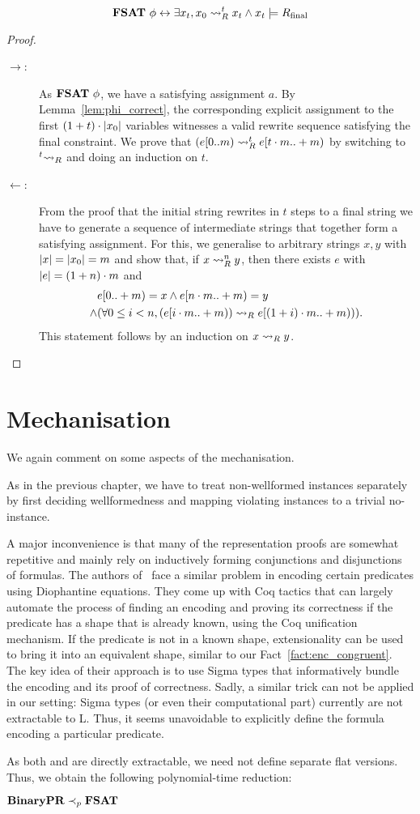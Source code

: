 \begin{theorem}
  \[\textbf{FSAT}~\phi \leftrightarrow \exists x_t, x_0 \rightsquigarrow_{R}^t x_t \land x_t \models R_{\text{final}} \]
\end{theorem}
\begin{proof}\leavevmode
  \begin{description}
    \item[$\rightarrow$:]
      As $\textbf{FSAT}{}~\phi$, we have a satisfying assignment $a$. 
      By Lemma~\ref{lem:phi_correct}, the corresponding explicit assignment to the first $(1 +{t}) \cdot |x_0|$ variables witnesses a valid rewrite sequence satisfying the final constraint. 
      We prove that $(e[0 ..m) \rightsquigarrow_{R}^t e[t \cdot m ..+ m)$ by switching to $\prescript{t}{}{\rightsquigarrow_{R}}$ and doing an induction on $t$.
    \item[$\leftarrow$:]
      From the proof that the initial string rewrites in $t$ steps to a final string we have to generate a sequence of intermediate strings that together form a satisfying assignment. 
      For this, we generalise to arbitrary strings $x, y$ with $|x| = |x_0| = m$ and show that, if $x \rightsquigarrow_{R}^n y$, then there exists $e$ with $|e| = (1 +{n}) \cdot m$ and 
      \begin{align*}
        &e[0..+ m) = x \land e[n \cdot m ..+ m) = y \\
        \land & (\forall 0 \le i < n, (e[i \cdot m ..+ m)) \rightsquigarrow_{R} e[(1 +{i}) \cdot m ..+ m))).
      \end{align*}
      This statement follows by an induction on $x \rightsquigarrow_{R} y$.
  \end{description}
\end{proof}

\section{Mechanisation}
We again comment on some aspects of the mechanisation.

As in the previous chapter, we have to treat non-wellformed instances separately by first deciding wellformedness and mapping violating instances to a trivial no-instance. 

A major inconvenience is that many of the representation proofs are somewhat repetitive and mainly rely on inductively forming conjunctions and disjunctions of formulas. 
The authors of~\cite{Larchey-WendlingForster:2019:H10_in_Coq} face a similar problem in encoding certain predicates using Diophantine equations. They come up with Coq tactics that can largely automate the process of finding an encoding and proving its correctness if the predicate has a shape that is already known, using the Coq unification mechanism. If the predicate is not in a known shape, extensionality can be used to bring it into an equivalent shape, similar to our Fact~\ref{fact:enc_congruent}.
The key idea of their approach is to use Sigma types that informatively bundle the encoding and its proof of correctness. 
Sadly, a similar trick can not be applied in our setting: Sigma types (or even their computational part) currently are not extractable to L. Thus, it seems unavoidable to explicitly define the formula encoding a particular predicate.

As both \BPR{} and \fsat{} are directly extractable, we need not define separate flat versions. Thus, we obtain the following polynomial-time reduction:
\begin{theorem}
  $\textbf{BinaryPR}{} \prec_p{} \textbf{FSAT}{}$
\end{theorem}
